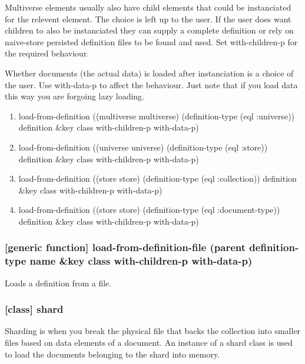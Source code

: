 \documentclass[11pt]{article}
\begin{document}
Multiverse elements usually also have child elements that could be
instanciated for the relevent element. The choice is left up to the
user. If the user does want children to also be instanciated they can
supply a complete definition or rely on naive-store persisted
definition files to be found and used. Set with-children-p for the
required behaviour.

Whether documents (the actual data) is loaded after instanciation is a
choice of the user. Use with-data-p to affect the behaviour. Just note
that if you load data this way you are forgoing lazy loading.

\begin{enumerate}
\item load-from-definition ((multiverse multiverse) (definition-type (eql :universe)) definition \&key class with-children-p with-data-p)
\label{sec:orgfefa082}
\item load-from-definition ((universe universe) (definition-type (eql :store)) definition \&key class with-children-p with-data-p)
\label{sec:orge13cfff}
\item load-from-definition ((store store) (definition-type (eql :collection)) definition \&key class with-children-p with-data-p)
\label{sec:org820a297}
\item load-from-definition ((store store) (definition-type (eql :document-type)) definition \&key class with-children-p with-data-p)
\label{sec:org2c2bd81}
\end{enumerate}

\subsubsection{[generic function] load-from-definition-file (parent definition-type name \&key class with-children-p with-data-p)}
\label{sec:org3773e82}

Loads a definition from a file.

\subsubsection{[class] shard}
\label{sec:orge6e2c7e}

Sharding is when you break the physical file that backs the collection
into smaller files based on data elements of a document. An instance
of a shard class is used to load the documents belonging to the shard
into memory.
\end{document}
